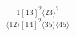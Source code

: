 \documentclass[varwidth, border=5pt]{standalone}
\begin{document}
\begin{my}
$\begin{gathered}
\scriptscriptstyle\frac{1[13]^2⟨23⟩^2}{⟨12⟩[14]^2⟨35⟩⟨45⟩}
\end{gathered}$
\end{my}
\end{document}
